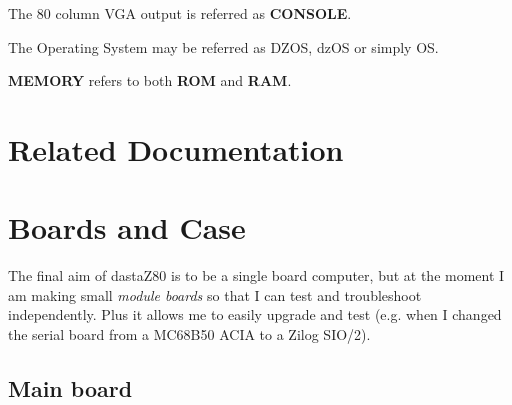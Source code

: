 \documentclass[a4paper,11pt]{article}
\begin{document}
    The 80 column VGA output is referred as \textbf{CONSOLE}.
    
    The Operating System may be referred as DZOS, dzOS or simply OS.

    \textbf{MEMORY} refers to both \textbf{ROM} and \textbf{RAM}.

    \pagebreak
    \section*{Related Documentation}
    \hspace{1cm}{\LARGE dastaZ80 User's Manual}
    
    \hspace{1cm}{\LARGE dastaZ80 Programmer's Reference Guide}

    \hspace{1cm}{\LARGE https://github.com/dasta400/dzOS}

    \pagebreak
    \tableofcontents

    \pagebreak
    \pagestyle{fancy}
    \fancyhf{}
    \fancyfoot[R]{\thepage}
    \setcounter{page}{1}

    \section{Boards and Case}

    The final aim of dastaZ80 is to be a single board computer, but at the 
    moment I am making small \textit{module boards} so that I can test and 
    troubleshoot independently. Plus it allows me to easily upgrade and test
    (e.g. when I changed the serial board from a MC68B50 ACIA to a Zilog SIO/2).

    \subsection{Main board}
\end{document}
